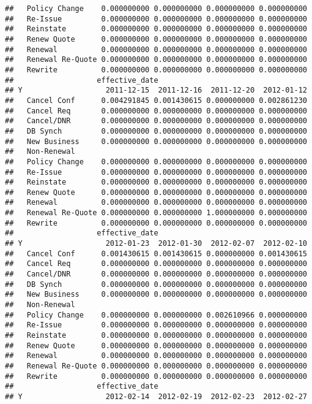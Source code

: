 \documentclass[]{article}
\begin{document}
\begin{verbatim}
##   Policy Change    0.000000000 0.000000000 0.000000000 0.000000000
##   Re-Issue         0.000000000 0.000000000 0.000000000 0.000000000
##   Reinstate        0.000000000 0.000000000 0.000000000 0.000000000
##   Renew Quote      0.000000000 0.000000000 0.000000000 0.000000000
##   Renewal          0.000000000 0.000000000 0.000000000 0.000000000
##   Renewal Re-Quote 0.000000000 0.000000000 0.000000000 0.000000000
##   Rewrite          0.000000000 0.000000000 0.000000000 0.000000000
##                   effective_date
## Y                   2011-12-15  2011-12-16  2011-12-20  2012-01-12
##   Cancel Conf      0.004291845 0.001430615 0.000000000 0.002861230
##   Cancel Req       0.000000000 0.000000000 0.000000000 0.000000000
##   Cancel/DNR       0.000000000 0.000000000 0.000000000 0.000000000
##   DB Synch         0.000000000 0.000000000 0.000000000 0.000000000
##   New Business     0.000000000 0.000000000 0.000000000 0.000000000
##   Non-Renewal                                                     
##   Policy Change    0.000000000 0.000000000 0.000000000 0.000000000
##   Re-Issue         0.000000000 0.000000000 0.000000000 0.000000000
##   Reinstate        0.000000000 0.000000000 0.000000000 0.000000000
##   Renew Quote      0.000000000 0.000000000 0.000000000 0.000000000
##   Renewal          0.000000000 0.000000000 0.000000000 0.000000000
##   Renewal Re-Quote 0.000000000 0.000000000 1.000000000 0.000000000
##   Rewrite          0.000000000 0.000000000 0.000000000 0.000000000
##                   effective_date
## Y                   2012-01-23  2012-01-30  2012-02-07  2012-02-10
##   Cancel Conf      0.001430615 0.001430615 0.000000000 0.001430615
##   Cancel Req       0.000000000 0.000000000 0.000000000 0.000000000
##   Cancel/DNR       0.000000000 0.000000000 0.000000000 0.000000000
##   DB Synch         0.000000000 0.000000000 0.000000000 0.000000000
##   New Business     0.000000000 0.000000000 0.000000000 0.000000000
##   Non-Renewal                                                     
##   Policy Change    0.000000000 0.000000000 0.002610966 0.000000000
##   Re-Issue         0.000000000 0.000000000 0.000000000 0.000000000
##   Reinstate        0.000000000 0.000000000 0.000000000 0.000000000
##   Renew Quote      0.000000000 0.000000000 0.000000000 0.000000000
##   Renewal          0.000000000 0.000000000 0.000000000 0.000000000
##   Renewal Re-Quote 0.000000000 0.000000000 0.000000000 0.000000000
##   Rewrite          0.000000000 0.000000000 0.000000000 0.000000000
##                   effective_date
## Y                   2012-02-14  2012-02-19  2012-02-23  2012-02-27

\end{verbatim}
\end{document}
